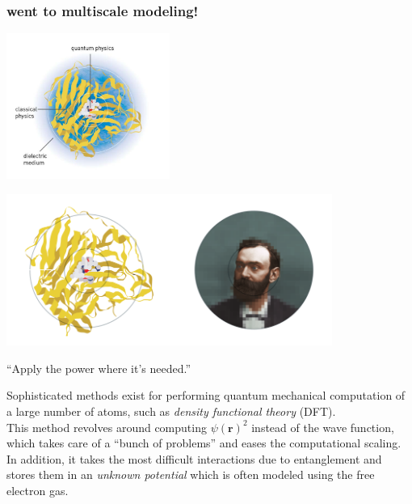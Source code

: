 \documentclass[
paper=128mm:96mm, %
fontsize=11pt, %
pagesize, %
parskip=half-, %
]{scrartcl} %
\theoremstyle{mythmstyle} %
\begin{document}
\subsubsection*{went to multiscale modeling!}
\begin{center}
\includegraphics[width=0.4\textwidth]{multiscale}
\end{center}

\clearpage

\begin{center}
\includegraphics[width=0.8\textwidth]{multiscaleImage}
\end{center}

``Apply the power where it's needed.''

\clearpage

Sophisticated methods exist for performing quantum mechanical computation of a large number of atoms, such as \textit{density functional theory} (DFT).\\

This method revolves around computing $\psi(\mathbf{r})^2$ instead of the wave function, which takes care of a ``bunch of problems'' and eases the computational scaling. \\

In addition, it takes the most difficult interactions due to entanglement and stores them in an \textit{unknown potential} which is often modeled using the free electron gas.

\clearpage
\end{document}
